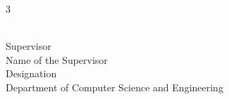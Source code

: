 \begin{titlepage}
\begin{multicols}{3}
    \begin{flushleft}
        \hrulefill \\
        {\hspace{0.5mm}Supervisor\\\hspace{0.5mm}Name of the Supervisor\\
        \hspace{0.5mm}Designation \\\hspace{0.5mm}Department of Computer Science and Engineering}\\
    \end{flushleft}
\end{multicols}

\end{titlepage}
